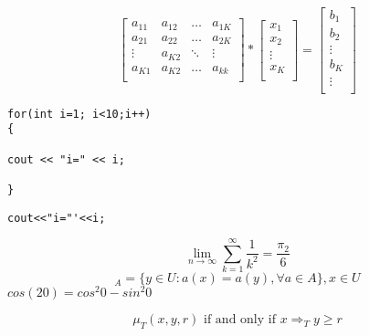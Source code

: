 \documentclass{article}
\begin{document}
\begin{equation}
\left[
\begin{array}{cccc}
a_{11} & a_{12} & \ldots & a_{1K} \\
a_{21} & a_{22} & \ldots & a_{2K} \\
\vdots & a_{K2} & \ddots & \vdots \\
a_{K1} & a_{K2} & \ldots & a_{kk} \\
\end{array}
\right]*
\left[
\begin{array}{c}
x_1 \\
x_2 \\
\vdots \\
x_K \\
\end{array}
\right] =
\left[
\begin{array}{c}
b_1\\
b_2\\
\vdots\\
b_K\\
\vdots\\
\end{array}
\right]
\end{equation}


\begin{verbatim}
for(int i=1; i<10;i++)
{

cout << "i=" << i;

}
\end{verbatim}

\begin{algorithmic}
\item{\verb+cout<<"i="'<<i;+}
\ENDFOR
\end{algorithmic}

\begin{equation} %
\lim_{n \to \infty} \sum_{k=1}^{\infty} \frac{1}{k^{2}}=\frac{\pi_{2}}{6}
\end{equation}
\begin{equation}
[x]_{A}=\{y\in U : a(x) = a(y), \forall a \in A \}, x\in U
\end{equation}
$ cos(20)=cos^{2}0-sin^{2}0 $
\begin{equation}
\end{equation}

\begin{equation}\label{inter}
\mu_T(x, y, r) \mbox{ if and only if } x\Rightarrow_T y \geq r
\end{equation}
\end{document}
